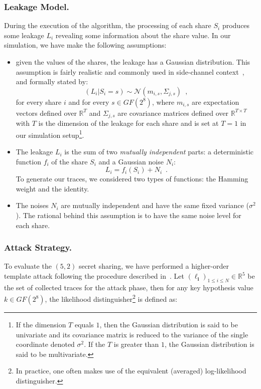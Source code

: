 \documentclass{llncs}
\begin{document}
\subsubsection{Leakage Model.}
During the execution of the algorithm, the processing of each share $S_i$ produces some leakage $L_i$ revealing some information about the share value. In our simulation, we have make the following assumptions:
\begin{itemize}
\item given the values of the shares, the leakage has a Gaussian distribution. This assumption is fairly realistic and commonly used in side-channel context~\cite{LPRRT14}, and formally stated by: 
\begin{equation*}
(L_i | S_i = s) \sim \mathcal{N} (m_{i,s}, \Sigma_{j,s}) \enspace,
\end{equation*}
for every share $i$ and for every $s \in GF(2^8)$, where $m_{i,s}$ are expectation vectors defined over $\mathbb{R}^T$ and $\Sigma_{j,s}$ are covariance matrices defined over $\mathbb{R}^{T \times T}$ with $T$ is the dimension of the leakage for each share and is set at $T=1$ in our simulation setup\footnote{If the dimension $T$ equals $1$, then the Gaussian distribution is said to be univariate and its covariance matrix is reduced to the variance of the single coordinate denoted $\sigma^2$. If the $T$ is greater
than $1$, the Gaussian distribution is said to be multivariate.}.
\item The leakage $L_i$ is the sum of two \textit{mutually independent} parts: a deterministic function $f_i$ of the share $S_i$ and a Gaussian noise $N_i$:
\begin{equation*}
L_i = f_i(S_i) +  N_i \enspace.
\end{equation*}
To generate our traces, we considered two types of functions: the Hamming weight and the identity. 
\item The noises $N_i$ are mutually independent and have the same fixed variance ($\sigma^2$). The rational behind this assumption is to have the same noise level for each share. 
\end{itemize}

\subsubsection{Attack Strategy.} To evaluate the $(5,2)$ secret sharing, we have performed a higher-order template attack following the procedure described in~\cite{LPRRT14}. Let $(\boldsymbol{\ell_i})_{1\le i \le N} \in \mathbb{R}^5$ be the set of collected traces for the attack phase, then for any key hypothesis value $k\in GF(2^8)$, the likelihood distinguisher\footnote{In practice, one often makes use of the equivalent (averaged) log-likelihood distinguisher.} is defined as:
\end{document}
